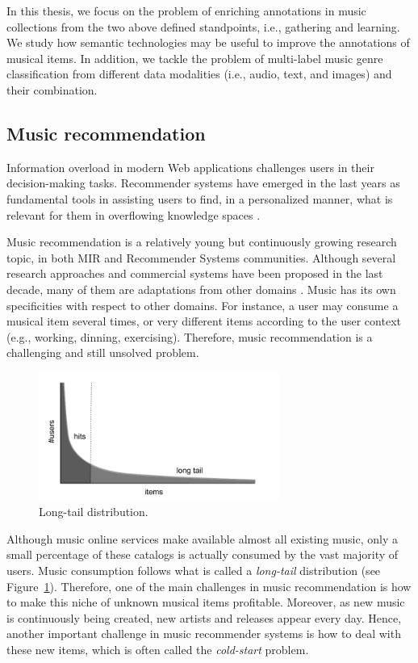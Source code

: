 In this thesis, we focus on the problem of enriching annotations in music collections from the two above defined standpoints, i.e., gathering and learning. We study how semantic technologies may be useful to improve the annotations of musical items. In addition, we tackle the problem of multi-label music genre classification from different data modalities (i.e., audio, text, and images) and their combination.


\subsection{Music recommendation}
\label{sec:intro:recommendation}

Information overload in modern Web applications challenges users in their decision-making tasks. Recommender systems have emerged in the last years as fundamental tools in assisting users to find, in a personalized manner, what is relevant for them in overflowing knowledge spaces \citep{ricci2011introduction}. 

Music recommendation is a relatively young but continuously growing research topic, in both MIR and Recommender Systems communities. Although several research approaches and commercial systems have been proposed in the last decade, many of them are adaptations from other domains \citep{oscarBook}. 
Music has its own specificities with respect to other domains. For instance, a user may consume a musical item several times, or very different items according to the user context (e.g., working, dinning, exercising). Therefore, music recommendation is a challenging and still unsolved problem.

\begin{figure}
	\centering
	\includegraphics[width=0.7\textwidth]{ch01_introduction_pics/Long_tail_bn.png}
	\caption{Long-tail distribution.\label{fig:soa:longtail}}
\end{figure}

Although music online services make available almost all existing music, only a small percentage of these catalogs is actually consumed by the vast majority of users. Music consumption follows what is called a \textit{long-tail} distribution \citep{oscarBook} (see Figure~\ref{fig:soa:longtail}). Therefore, one of the main challenges in music recommendation is how to make this niche of unknown musical items profitable. Moreover, as new music is continuously being created, new artists and releases appear every day. Hence, another important challenge in music recommender systems is how to deal with these new items, which is often called the \textit{cold-start} problem. %

